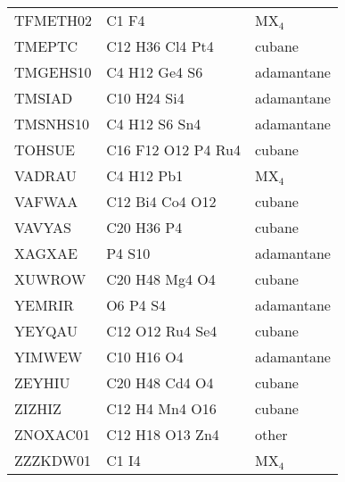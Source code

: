 \documentclass{article}
\begin{document}
\begin{table}
\begin{tabular}{lll}
TFMETH02 & C1 F4 & MX$_4$\\
TMEPTC & C12 H36 Cl4 Pt4 & cubane\\
TMGEHS10 & C4 H12 Ge4 S6 & adamantane\\
TMSIAD & C10 H24 Si4 & adamantane\\
TMSNHS10 & C4 H12 S6 Sn4 & adamantane\\
TOHSUE & C16 F12 O12 P4 Ru4 & cubane\\
VADRAU & C4 H12 Pb1 & MX$_4$\\
VAFWAA & C12 Bi4 Co4 O12 & cubane\\
VAVYAS & C20 H36 P4 & cubane\\
XAGXAE & P4 S10 & adamantane\\
XUWROW & C20 H48 Mg4 O4 & cubane\\
YEMRIR & O6 P4 S4 & adamantane\\
YEYQAU & C12 O12 Ru4 Se4 & cubane\\
YIMWEW & C10 H16 O4 & adamantane\\
ZEYHIU & C20 H48 Cd4 O4 & cubane\\
ZIZHIZ & C12 H4 Mn4 O16 & cubane\\
ZNOXAC01 & C12 H18 O13 Zn4 & other\\
ZZZKDW01 & C1 I4 & MX$_4$\\
\hline
\end{tabular}
\end{table}
\end{document}
